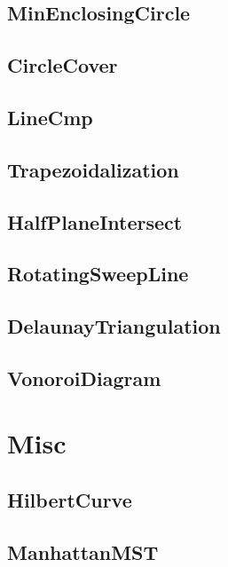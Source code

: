 \subsection{MinEnclosingCircle}

\subsection{CircleCover}

\subsection{LineCmp}

\subsection{Trapezoidalization}

\subsection{HalfPlaneIntersect}

\subsection{RotatingSweepLine}

\subsection{DelaunayTriangulation}

\subsection{VonoroiDiagram}

\section{Misc}
\subsection{HilbertCurve}

\subsection{ManhattanMST}

